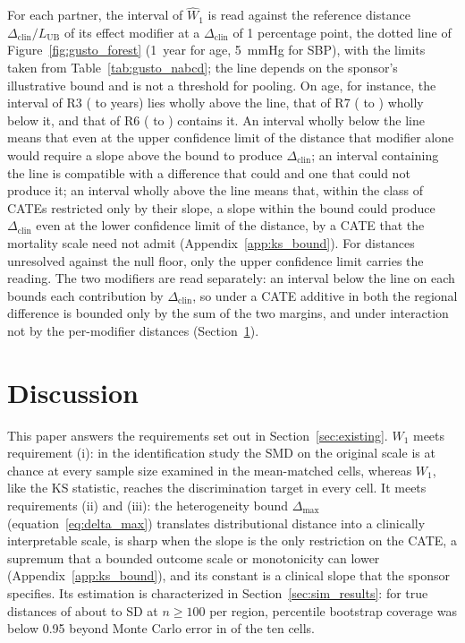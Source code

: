 \documentclass[AMA,Times1COL]{WileyNJDv5}
\begin{document}
For each partner, the interval of $\widehat{W}_1$ is read against the reference distance $\Delta_{\text{clin}} / L_{\text{UB}}$ of its effect modifier at a $\Delta_{\text{clin}}$ of 1 percentage point, the dotted line of Figure~\ref{fig:gusto_forest} (1~year for age, 5~mmHg for SBP), with the limits taken from Table~\ref{tab:gusto_nabcd}; the line depends on the sponsor's illustrative bound and is not a threshold for pooling. On age, for instance, the interval of R3 ( to  years) lies wholly above the line, that of R7 ( to ) wholly below it, and that of R6 ( to ) contains it. An interval wholly below the line means that even at the upper confidence limit of the distance that modifier alone would require a slope above the bound to produce $\Delta_{\text{clin}}$; an interval containing the line is compatible with a difference that could and one that could not produce it; an interval wholly above the line means that, within the class of CATEs restricted only by their slope, a slope within the bound could produce $\Delta_{\text{clin}}$ even at the lower confidence limit of the distance, by a CATE that the mortality scale need not admit (Appendix~\ref{app:ks_bound}). For distances unresolved against the null floor, only the upper confidence limit carries the reading. The two modifiers are read separately: an interval below the line on each bounds each contribution by $\Delta_{\text{clin}}$, so under a CATE additive in both the regional difference is bounded only by the sum of the two margins, and under interaction not by the per-modifier distances (Section~\ref{sec:discussion}).

\section{Discussion}\label{sec:discussion}

This paper answers the requirements set out in Section~\ref{sec:existing}. $W_1$ meets requirement (i): in the identification study the SMD on the original scale is at chance at every sample size examined in the mean-matched cells, whereas $W_1$, like the KS statistic, reaches the discrimination target in every cell. It meets requirements (ii) and (iii): the heterogeneity bound \(\Delta_{\max}\) (equation~\ref{eq:delta_max}) translates distributional distance into a clinically interpretable scale, is sharp when the slope is the only restriction on the CATE, a supremum that a bounded outcome scale or monotonicity can lower (Appendix~\ref{app:ks_bound}), and its constant is a clinical slope that the sponsor specifies. Its estimation is characterized in Section~\ref{sec:sim_results}: for true distances of about  to  SD at $n \geq 100$ per region, percentile bootstrap coverage was below 0.95 beyond Monte Carlo error in  of the ten cells.
\end{document}
